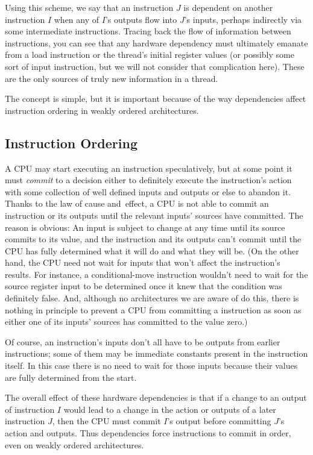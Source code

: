 \documentclass[10]{article}
\begin{document}
Using this scheme, we say that an instruction $J$ is dependent on
another instruction $I$ when any of $I$'s outputs flow into $J$'s inputs,
perhaps indirectly via some intermediate instructions.
Tracing back the flow of information between instructions, you can
see that any hardware dependency must ultimately emanate from a load
instruction or the thread's initial register values (or possibly some sort of
input instruction, but we will not consider that complication here).
These are the only sources of truly new information in a thread.

The concept is simple, but it is important because of the way
dependencies affect instruction ordering in weakly ordered architectures.

\subsection{Instruction Ordering}
\label{sec:Instruction Ordering}

A CPU may start executing an instruction speculatively, but at some
point it must \emph{commit} to a decision either to definitely execute the
instruction's action with some collection of well defined inputs and outputs
or else to abandon it.
Thanks to the law of cause and~effect, a CPU is not able to commit an
instruction or its outputs until the relevant inputs' sources have committed.
The reason is obvious: An input is subject to change at any time until
its source commits to its value,
and the instruction and its outputs can't commit until the CPU has fully
determined what it will do and what they will be.
(On the other hand, the CPU need not wait for inputs that won't affect
the instruction's results.
For instance, a conditional-move instruction wouldn't need to wait for
the source register input to be determined once it knew that the
condition was definitely false.
And, although no architectures we are aware of do this, there is nothing
in principle to prevent a CPU from committing a 
instruction as soon as either one of its inputs' sources has committed to the
value zero.)

Of course, an instruction's inputs don't all have to be outputs from
earlier instructions; some of them may be immediate constants present
in the instruction itself.
In this case there is no need to wait for those inputs because
their values are fully determined from the start.

The overall effect of these hardware dependencies is that if a change to an
output of instruction $I$ would lead to a change in the action or outputs of
a later instruction $J$, then the CPU must commit $I$'s output before
committing $J$'s action and outputs.
Thus dependencies force instructions to commit in order, even on
weakly ordered architectures.
\end{document}
